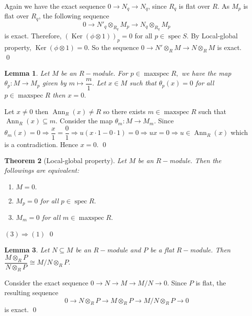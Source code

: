 \documentclass[11pt]{amsart}
\newtheorem{theorem}{Theorem}[section]
\newtheorem{lemma}[theorem]{Lemma}%
\DeclareMathOperator{\Ker}{\text{Ker}}
\DeclareMathOperator{\spec}{\text{spec}}
\DeclareMathOperator{\mspec}{\text{maxspec}}
\begin{document}
Again we have the exact sequence $0\to N_q\to N_q$, since $R_q$ is flat over $R$. As $M_p$ is flat over $R_q$, the following sequence $$0\to N'_q\otimes_{R_q} M_p\to N_q\otimes_{R_q} M_p$$ 
is exact. Therefore, $(\Ker(\phi\otimes 1))_p=0$ for all $p\in \spec S$. By Local-global property, $\Ker(\phi\otimes 1)=0$. So the sequence $0\to N'\otimes_R M\to N\otimes_R M$ is exact. \qed

\begin{lemma}
Let $M$ be an $R-$module. For $p\in \mspec R,$ we have the map $\theta_p:M\to M_p$ given by $m\mapsto \dfrac{m}{1}.$ Let $x\in M$ such that $\theta_p(x)=0$ for all $p\in\mspec R$ then $x=0.$
\end{lemma}

\proof Let $x\neq 0$ then $\operatorname{Ann}_R(x)\neq R$ so there exists $m\in \mspec R$ such that $\operatorname{Ann}_R (x)\subseteq m.$ Consider the map $\theta_m:M\to M_m$. Since $\theta_m(x)=0 \Rightarrow \dfrac{x}{1}=\dfrac{0}{1}\Rightarrow u(x\cdot 1-0\cdot 1)=0 \Rightarrow ux=0 \Rightarrow u\in \operatorname{Ann}_R(x)$ which is a contradiction. Hence $x=0.$ \qed

\begin{theorem}[Local-global property]

Let $M$ be an $R-$module. Then the followings are equivalent:

\begin{enumerate}

\item $M=0.$

\item $M_p=0$ for all $p\in\spec R.$

\item $M_m=0$ for all $m\in\mspec R.$

\end{enumerate}

\end{theorem}

\proof $(3)\Rightarrow (1)$ \qed


\begin{lemma}

Let $N\subseteq M$ be an $R-$module and $P$ be a flat $R-$module. Then $\dfrac{M\otimes_R P}{N\otimes_R P}\cong M/N\otimes_R P.$

\end{lemma}

\proof Consider the exact sequence $0\to N\to M\to M/N\to 0$. Since $P$ is flat, the resulting sequence $$0\to N\otimes_R P\to M\otimes_R P\to M/N\otimes_R P\to 0$$ is exact. \qed
\end{document}
